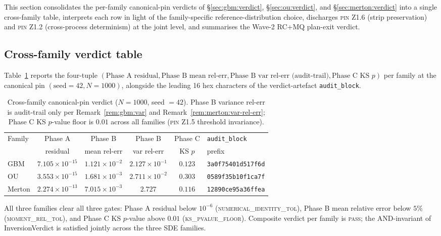 \documentclass[11pt,letterpaper]{article}
\newcommand{\PinZ}[1]{\textsc{pin Z1.#1}}
\begin{document}
This section consolidates the per-family canonical-pin verdicts of
\S\ref{sec:gbm:verdict}, \S\ref{sec:ou:verdict}, and
\S\ref{sec:merton:verdict} into a single cross-family table, interprets
each row in light of the family-specific reference-distribution choice,
discharges \PinZ{6} (strip preservation) and \PinZ{2} (cross-process
determinism) at the joint level, and summarises the Wave-2 RC+MQ
plan-exit verdict.

\subsection{Cross-family verdict table}
\label{sec:results:table}

Table~\ref{tab:cross-family} reports the four-tuple
\((\text{Phase A residual}, \text{Phase B mean rel-err},
\text{Phase B var rel-err (audit-trail)}, \text{Phase C KS } p)\)
per family at the canonical pin
$(\text{seed} = 42, N = 1000)$, alongside the leading 16 hex characters
of the verdict-artefact \texttt{audit\_block}.

\begin{table}[h]
\centering
\caption{Cross-family canonical-pin verdict
($N = 1000$, seed $= 42$). Phase B variance rel-err is audit-trail only
per Remark~\ref{rem:gbm:var} and Remark~\ref{rem:merton:var-rel-err};
Phase C KS $p$-value floor is $0.01$ across all families
(\PinZ{5} threshold invariance).}
\label{tab:cross-family}
\begin{tabular}{l c c c c l}
\toprule
Family & Phase A & Phase B & Phase B & Phase C & \texttt{audit\_block} \\
       & residual & mean rel-err & var rel-err & KS $p$ & prefix \\
\midrule
GBM    & $7.105\!\times\!10^{-15}$ & $1.121\!\times\!10^{-2}$
       & $2.127\!\times\!10^{-1}$ & $0.123$ & \texttt{3a0f75401d517f6d} \\
OU     & $3.553\!\times\!10^{-15}$ & $1.681\!\times\!10^{-3}$
       & $2.711\!\times\!10^{-2}$ & $0.303$ & \texttt{0589f35b10f1ca7f} \\
Merton & $2.274\!\times\!10^{-13}$ & $7.015\!\times\!10^{-3}$
       & $2.727$                  & $0.116$ & \texttt{12890ce95a36ffea} \\
\bottomrule
\end{tabular}
\end{table}

All three families clear all three gates: Phase A residual below
$10^{-6}$ (\textsc{numerical\_identity\_tol}), Phase B mean relative
error below $5\%$ (\textsc{moment\_rel\_tol}), and Phase C KS
$p$-value above $0.01$ (\textsc{ks\_pvalue\_floor}). Composite verdict
per family is \textsc{pass}; the AND-invariant of
\textsf{InversionVerdict} is satisfied jointly across the three SDE
families.
\end{document}

